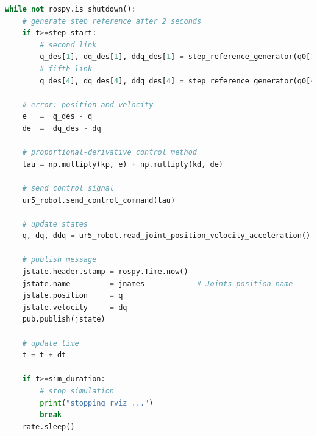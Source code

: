 \begin{lstlisting}[language=Python,caption={Move the second and fifth joint of UR5 robot with the required movement of activity 1.4.}, label={lst:joint_PD_control_high_gains}]
while not rospy.is_shutdown():
    # generate step reference after 2 seconds
    if t>=step_start:
        # second link
        q_des[1], dq_des[1], ddq_des[1] = step_reference_generator(q0[1], -0.4)
        # fifth link
        q_des[4], dq_des[4], ddq_des[4] = step_reference_generator(q0[4], 0.5)

    # error: position and velocity
    e 	=  q_des - q
    de 	=  dq_des - dq    

    # proportional-derivative control method
    tau = np.multiply(kp, e) + np.multiply(kd, de)
    
    # send control signal
    ur5_robot.send_control_command(tau)
    
    # update states
    q, dq, ddq = ur5_robot.read_joint_position_velocity_acceleration()

    # publish message
    jstate.header.stamp = rospy.Time.now()
    jstate.name 		= jnames			# Joints position name
    jstate.position 	= q
    jstate.velocity 	= dq
    pub.publish(jstate)

    # update time
    t = t + dt

    if t>=sim_duration:
        # stop simulation
        print("stopping rviz ...")
        break
    rate.sleep()
\end{lstlisting}

